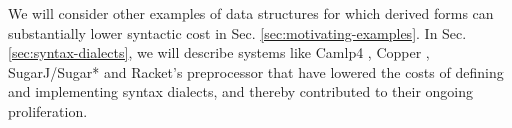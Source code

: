 We will consider other examples of data structures for which derived forms can substantially lower syntactic cost in Sec. \ref{sec:motivating-examples}. In Sec. \ref{sec:syntax-dialects}, we will describe systems like Camlp4 \cite{ocaml-manual}, Copper \cite{conf/gpce/WykS07}, SugarJ/Sugar* \cite{erdweg2011sugarj,erdweg2013framework} and Racket's preprocessor \cite{Flatt:2012:CLR:2063176.2063195} that have lowered the costs of defining and implementing syntax dialects, and thereby contributed to their ongoing proliferation.






